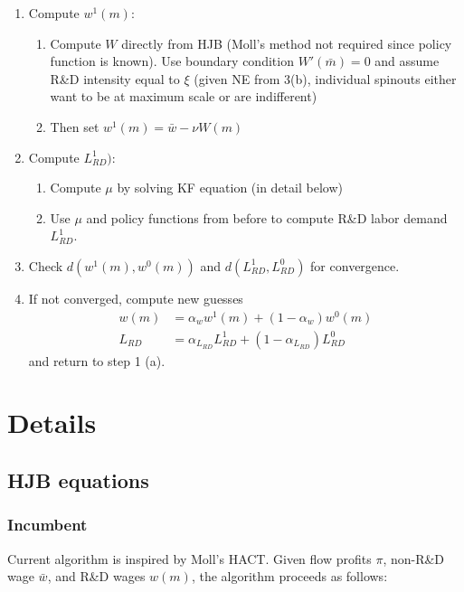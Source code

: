 \documentclass[12pt,english]{article}
\theoremstyle{remark}
\begin{document}
\begin{enumerate}
	\begin{enumerate}
		\item Compute $w^1(m)$:
		\begin{enumerate}
			\item Compute $W$ directly from HJB (Moll's method not required since policy function is known). Use boundary condition $W'(\bar{m}) = 0$ and assume R\&D intensity equal to $\xi$ (given NE from 3(b), individual spinouts either want to be at maximum scale or are indifferent)	
			\item Then set $w^1(m) = \bar{w} - \nu W(m)$
		\end{enumerate}
		\item Compute $L^1_{RD})$:
		\begin{enumerate}
			\item Compute $\mu$ by solving KF equation (in detail below) 
			\item Use $\mu$ and policy functions from before to compute R\&D labor demand $L^1_{RD}$.
		\end{enumerate}
	 	\item Check $d(w^1(m),w^0(m))$ and $d(L^1_{RD},L^0_{RD})$ for convergence.
	 	\item If not converged, compute new guesses
	 	\begin{align*}
	 		w(m) &= \alpha_w w^1(m) + (1-\alpha_w) w^0(m) \\
	 		L_{RD} &= \alpha_{L_{RD}} L^1_{RD} + (1-\alpha_{L_{RD}}) L^0_{RD}
	 	\end{align*}
	 	and return to step 1 (a). 
	\end{enumerate}
\end{enumerate}

\section{Details}

\subsection{HJB equations}

\subsubsection{Incumbent}

Current algorithm is inspired by Moll's HACT. Given flow profits $\pi$, non-R\&D wage $\bar{w}$, and R\&D wages $w(m)$, the algorithm proceeds as follows:
\end{document}
